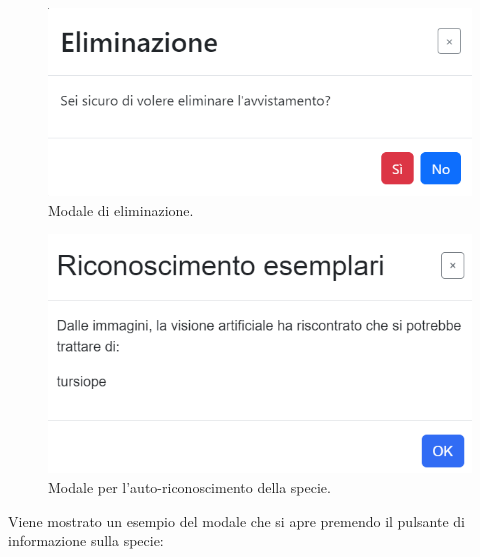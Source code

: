 \documentclass[a4paper,final,12pt]{report}
\begin{document}
\begin{figure}[hbtp]
\centering
\includegraphics[scale=0.55]{img_concettuale/eliminazione.png}
\caption{Modale di eliminazione.}
\end{figure}
\begin{figure}[hbtp]
\centering
\includegraphics[scale=0.50]{img_concettuale/autoric.png}
\caption{Modale per l'auto-riconoscimento della specie.}
\end{figure}
\newpage
Viene mostrato un esempio del modale che si apre premendo il pulsante di informazione sulla specie:
\end{document}
